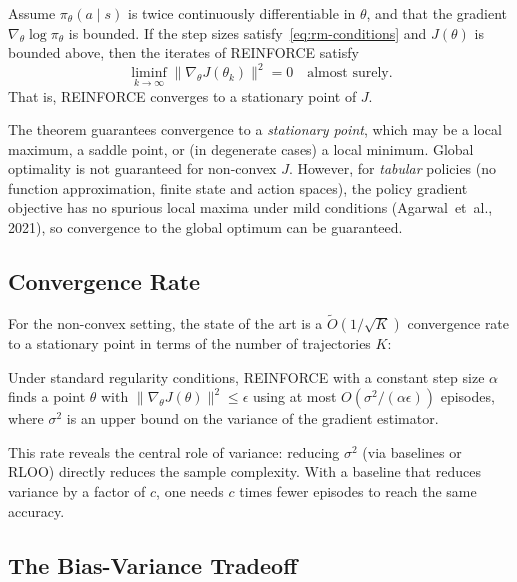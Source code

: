 \begin{theorem}
\label{thm:reinforce-convergence}
Assume $\pi_\theta(a \mid s)$ is twice continuously differentiable in $\theta$, and that the gradient $\nabla_\theta \log \pi_\theta$ is bounded.  If the step sizes satisfy~\eqref{eq:rm-conditions} and $J(\theta)$ is bounded above, then the iterates of REINFORCE satisfy
\[
\liminf_{k \to \infty} \|\nabla_\theta J(\theta_k)\|^2 = 0 \quad \text{almost surely.}
\]
That is, REINFORCE converges to a stationary point of $J$.
\end{theorem}

The theorem guarantees convergence to a \emph{stationary point}, which may be a local maximum, a saddle point, or (in degenerate cases) a local minimum.  Global optimality is not guaranteed for non-convex $J$.  However, for \emph{tabular} policies (no function approximation, finite state and action spaces), the policy gradient objective has no spurious local maxima under mild conditions (Agarwal~et~al., 2021), so convergence to the global optimum can be guaranteed.

\subsection{Convergence Rate}

For the non-convex setting, the state of the art is a $\tilde O(1/\sqrt{K})$ convergence rate to a stationary point in terms of the number of trajectories $K$:

\begin{theorem}
\label{thm:reinforce-rate}
Under standard regularity conditions, REINFORCE with a constant step size $\alpha$ finds a point $\theta$ with $\|\nabla_\theta J(\theta)\|^2 \leq \epsilon$ using at most $O(\sigma^2 / (\alpha \epsilon))$ episodes, where $\sigma^2$ is an upper bound on the variance of the gradient estimator.
\end{theorem}

This rate reveals the central role of variance: reducing $\sigma^2$ (via baselines or RLOO) directly reduces the sample complexity.  With a baseline that reduces variance by a factor of $c$, one needs $c$ times fewer episodes to reach the same accuracy.

\subsection{The Bias-Variance Tradeoff}

